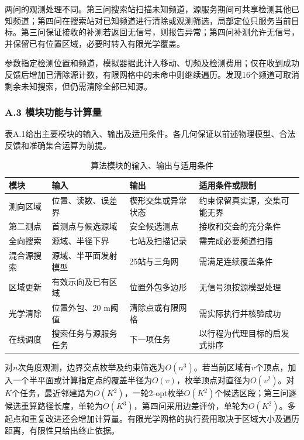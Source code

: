 \documentclass[UTF8,fontset=none,zihao=-4,a4paper]{ctexart}
\begin{document}
两问的观测处理不同。第三问搜索站扫描未知频道，源服务期间可共享检测其他已知频道；第四问在搜索站对已知频道进行清除或观测筛选，局部定位只服务当前目标。第三问保证接收的补测若返回无信号，则报告异常；第四问补测允许无信号，并保留已有位置区域，必要时转入有限光学覆盖。

参数指定检测位置和频道，模拟器据此计入移动、切频及检测费用；仅在收到成功反馈后增加已清除源计数，有限网格中的未命中则继续遍历。发现16个频道可取消剩余未知搜索，但仍需清除全部已知源。

\subsubsection{A.3 模块功能与计算量}\label{sec-A-3}

表A.1给出主要模块的输入、输出及适用条件。各几何保证以前述物理模型、合法反馈和准确集合运算为前提。

\begin{table}[H]
\centering\small
\caption{算法模块的输入、输出与适用条件}\label{tab-A-1}
\begin{tabular}{@{}>{\raggedright\arraybackslash}p{}
>{\raggedright\arraybackslash}p{}
>{\raggedright\arraybackslash}p{}
>{\raggedright\arraybackslash}p{}@{}}
\toprule
模块 & 输入 & 输出 & 适用条件或限制\tabularnewline
\midrule

测向区域 & 位置、读数、误差界 & 楔形交集或异常状态 & 约束保留真实源，交集可能无界\tabularnewline
第二测点 & 首测点与候选源域 & 安全候选测点 & 接收和交会的充分条件\tabularnewline
全向搜索 & 源域、半径下界 & 七站及扫描记录 & 需完成必要频道扫描\tabularnewline
混合源搜索 & 源域、半平面发射模型 & 25站与三角网 & 需满足连续覆盖条件\tabularnewline
区域更新 & 有效示向及已有区域 & 位置外包多边形 & 无信号须按源模型处理\tabularnewline
光学清除 & 位置外包、20 m阈值 & 清除点或有限网格 & 需实际执行并核验成功\tabularnewline
在线调度 & 搜索任务与源服务任务 & 下一项任务 & 以行程为代理目标的启发式排序\tabularnewline
\bottomrule
\end{tabular}
\end{table}

对\(n\)次角度观测，边界交点枚举及约束筛选为\(O(n^3)\)。若当前区域有\(v\)个顶点，加入一个半平面或计算指定点的覆盖半径为\(O(v)\)，枚举顶点对直径为\(O(v^2)\)。对\(K\)个任务，最近邻建路为\(O(K^2)\)，一轮2-opt枚举\(O(K^2)\)个候选区段；第三问逐候选重算路径长度，单轮为\(O(K^3)\)，第四问采用边差评价，单轮为\(O(K^2)\)。多起点和重复改进还会增加计算量。有限光学网格的执行费用取决于区域大小及遍历距离，有限性只给出终止依据。
\end{document}
